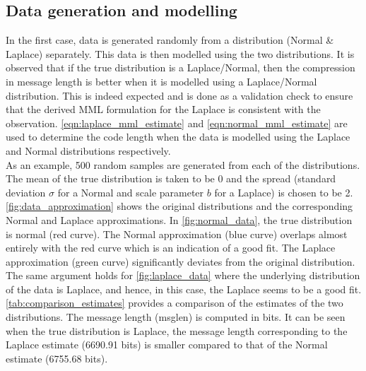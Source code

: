 \documentclass[wcp]{jmlr}
\begin{document}
\subsection{Data generation and modelling}
In the first case, data is generated randomly from a distribution (Normal \& Laplace) 
separately. This data is then modelled using the two distributions.
It is observed that if the true distribution is a Laplace/Normal, then the
compression in message length is better when it is modelled using a Laplace/Normal
distribution. This is indeed expected and is done as a validation check to ensure that 
the derived MML formulation for the Laplace is consistent with the observation.
\eqref{eqn:laplace_mml_estimate} and \eqref{eqn:normal_mml_estimate} are used to determine
the code length when the data is modelled using the Laplace and Normal distributions
respectively. \\

As an example, 500 random samples are generated from each of the distributions.
The mean of the true distribution is taken to be 0 and the spread (standard
deviation $\sigma$ for a Normal and scale parameter $b$ for a Laplace) is
chosen to be 2. \autoref{fig:data_approximation} shows the original distributions
and the corresponding Normal and Laplace approximations. In \autoref{fig:normal_data},
the true distribution is normal (red curve). The Normal approximation (blue curve)
overlaps almost entirely with the red curve which is an indication of a good fit.
The Laplace approximation (green curve) significantly deviates from the original
distribution. The same argument holds for \autoref{fig:laplace_data} where the
underlying distribution of the data is Laplace, and hence, in this case, the Laplace
seems to be a good fit. \\

\autoref{tab:comparison_estimates} provides a comparison of the estimates of the
two distributions. The message length (msglen) is computed in bits. It can be seen
when the true distribution is Laplace, the message length corresponding to the Laplace 
estimate (6690.91 bits) is smaller compared to that of the Normal estimate (6755.68 bits).
\end{document}
